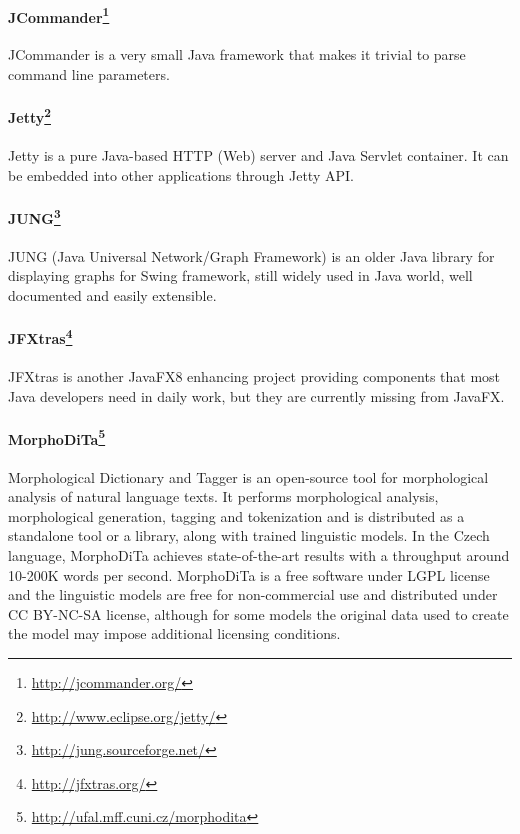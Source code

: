 \paragraph{JCommander\footnote{\url{http://jcommander.org/}}}
JCommander is a very small Java framework that makes it trivial to parse command
line parameters.

\paragraph{Jetty\footnote{\url{http://www.eclipse.org/jetty/}}}
Jetty is a pure Java-based HTTP (Web) server and Java Servlet container. It can
be embedded into other applications through Jetty API.

\paragraph{JUNG\footnote{\url{http://jung.sourceforge.net/}}}
JUNG (Java Universal Network/Graph Framework) is an older Java library for
displaying graphs for Swing framework, still widely used in Java world, well documented and easily extensible.

\paragraph{JFXtras\footnote{\url{http://jfxtras.org/}}}
JFXtras is another JavaFX8 enhancing project providing components that
most Java developers need in daily work, but they are currently missing
from JavaFX.

\paragraph{MorphoDiTa\footnote{\url{http://ufal.mff.cuni.cz/morphodita}}}
Morphological Dictionary and Tagger is an open-source tool for morphological
analysis of natural language texts. It performs morphological analysis, 
morphological generation, tagging and tokenization and is distributed as
a standalone tool or a library, along with trained linguistic models. In
the Czech language, MorphoDiTa achieves state-of-the-art results with 
a throughput around 10-200K words per second. MorphoDiTa is a free software
under LGPL license and the linguistic models are free for non-commercial use
and distributed under CC BY-NC-SA license, although for some models the original
data used to create the model may impose additional licensing conditions.


